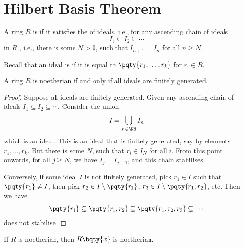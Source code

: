 \section{Hilbert Basis Theorem}

\begin{definition}
    \label{def:noetherian-ring}%
    A ring \(R\) is  if it satisfies the  of ideals, i.e., for any ascending chain of ideals
    \[
        I_1 \subseteq I_2 \subseteq \cdots
    \]
    in \(R\) , i.e., there is some \(N > 0\), such that \(I_{n + 1} = I_n\) for all \(n \geq N\).
\end{definition}

Recall that an ideal is  if it is equal to \(\pqty{r_1, \ldots, r_k}\) for \(r_i \in R\).

\begin{proposition}
    \label{prop:noetherian-ring-finitely-generated-ideal}%
    A ring \(R\) is noetherian if and only if all ideals are finitely generated.
\end{proposition}

\begin{proof}
    Suppose all ideals are finitely generated. Given any ascending chain of ideals \(I_1 \subseteq I_2 \subseteq \cdots\). Consider the union
    \[
        I = \bigcup_{n \in \NN} I_n
    \]
    which is an ideal. This is an ideal that is finitely generated, say by elements \(r_1, \ldots, r_k\). But there is some \(N\), such that \(r_i \in I_N\) for all \(i\). From this point onwards, for all \(j \geq N\), we have \(I_j = I_{j + 1}\), and this chain stabilises.

    Conversely, if some ideal \(I\) is not finitely generated, pick \(r_1 \in I\) such that \(\pqty{r_1} \neq I\), then pick \(r_2 \in I \setminus \pqty{r_1}\),   \(r_3 \in I \setminus \pqty{r_1, r_2}\), etc. Then we have
    \[
        \pqty{r_1} \subsetneq \pqty{r_1, r_2} \subsetneq \pqty{r_1, r_2, r_3} \subsetneq \cdots
    \]
    does not stabilise.
\end{proof}

\begin{theorem}
    If \(R\) is noetherian, then \(R\bqty{x}\) is noetherian.
\end{theorem}

